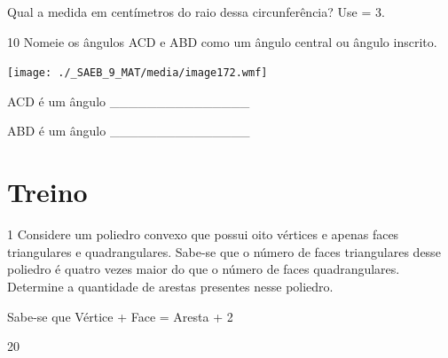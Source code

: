 \begin{escolha}
\begin{boxmedio}
\begin{boxmedio}
{\begin{boxpeq}
\begin{boxpeq}
{\begin{boxpeq}
\begin{boxmedio}
\begin{boxmedio}
\begin{boxpeq}
\begin{boxmedio}
\begin{boxpeq}
\begin{boxpeq}
\begin{boxpeq}
\begin{boxpeq}
\begin{boxmedio}
{\begin{boxmedio}
\begin{boxmedio}
\begin{boxpeq}
\begin{boxmedio}
\begin{boxpeq}
\begin{boxpeq}
\begin{boxpeq}
\begin{escolha}
{\begin{boxmedio}
\begin{boxpeq}
\begin{boxpeq}
\begin{boxpeq}
\begin{boxpeq}
\begin{boxpeq}
\begin{boxmedio}
\begin{boxpeq}
\begin{boxpeq}
\begin{boxpeq}
{\begin{boxpeq}
\begin{boxmedio}
\begin{boxpeq}
\begin{boxpeq}
\begin{boxpeq}
{\begin{boxpeq}
\begin{boxmedio}
{\begin{boxpeq}
\begin{boxpeq}
\begin{boxmedio}
\begin{boxmedio}
\begin{boxpeq}
\begin{boxpeq}
{\begin{boxpeq}
\begin{boxpeq}
\begin{boxpeq}
\begin{boxpeq}
\begin{boxpeq}
Qual a medida em centímetros do raio dessa circunferência? Use \Pi = 3. 


\num{10} Nomeie os ângulos ACD e ABD como um ângulo central ou ângulo
inscrito.

\texttt{[image: ./\_SAEB\_9\_MAT/media/image172.wmf]}


ACD é um ângulo \_\_\_\_\_\_\_\_\_\_\_\_\_\_\_

ABD é um ângulo \_\_\_\_\_\_\_\_\_\_\_\_\_\_\_


\section{Treino}

\num{1} Considere um poliedro convexo que possui oito vértices e apenas faces
triangulares e quadrangulares. Sabe-se que o número de faces
triangulares desse poliedro é quatro vezes maior do que o número de
faces quadrangulares. Determine a quantidade de arestas presentes nesse
poliedro.

Sabe-se que Vértice + Face = Aresta + 2

\begin{escolha}
  \item 20


\end{escolha}
\end{boxpeq}
\end{boxpeq}
\end{boxpeq}
\end{boxpeq}
\end{boxpeq}}
\end{boxpeq}
\end{boxpeq}
\end{boxmedio}
\end{boxmedio}
\end{boxpeq}
\end{boxpeq}}
\end{boxmedio}
\end{boxpeq}}
\end{boxpeq}
\end{boxpeq}
\end{boxpeq}
\end{boxmedio}
\end{boxpeq}}
\end{boxpeq}
\end{boxpeq}
\end{boxpeq}
\end{boxmedio}
\end{boxpeq}
\end{boxpeq}
\end{boxpeq}
\end{boxpeq}
\end{boxpeq}
\end{boxmedio}}
\end{escolha}
\end{boxpeq}
\end{boxpeq}
\end{boxpeq}
\end{boxmedio}
\end{boxpeq}
\end{boxmedio}
\end{boxmedio}}
\end{boxmedio}
\end{boxpeq}
\end{boxpeq}
\end{boxpeq}
\end{boxpeq}
\end{boxmedio}
\end{boxpeq}
\end{boxmedio}
\end{boxmedio}
\end{boxpeq}}
\end{boxpeq}
\end{boxpeq}}
\end{boxmedio}
\end{boxmedio}
\end{escolha}
